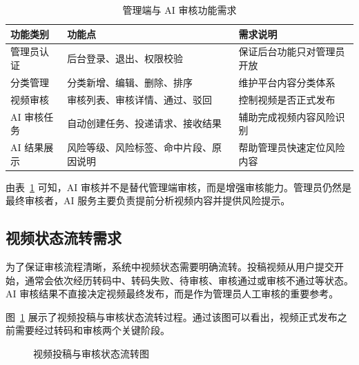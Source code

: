 \begin{table}[htbp]
  \centering
  \caption{管理端与 AI 审核功能需求}
  \label{tab:admin-ai-functions}
  \begin{tabular}{p{}p{}p{}}
    \hline
    \textbf{功能类别} & \textbf{功能点} & \textbf{需求说明} \\
    \hline
    管理员认证 & 后台登录、退出、权限校验 & 保证后台功能只对管理员开放 \\
    分类管理 & 分类新增、编辑、删除、排序 & 维护平台内容分类体系 \\
    视频审核 & 审核列表、审核详情、通过、驳回 & 控制视频是否正式发布 \\
    AI 审核任务 & 自动创建任务、投递请求、接收结果 & 辅助完成视频内容风险识别 \\
    AI 结果展示 & 风险等级、风险标签、命中片段、原因说明 & 帮助管理员快速定位风险内容 \\
    \hline
  \end{tabular}
\end{table}

由表~\ref{tab:admin-ai-functions} 可知，AI 审核并不是替代管理端审核，而是增强审核能力。管理员仍然是最终审核者，AI 服务主要负责提前分析视频内容并提供风险提示。

\subsection{视频状态流转需求}
\label{subsec:video-status-flow-requirements}

为了保证审核流程清晰，系统中视频状态需要明确流转。投稿视频从用户提交开始，通常会依次经历转码中、转码失败、待审核、审核通过或审核不通过等状态。AI 审核结果不直接决定视频最终发布，而是作为管理员人工审核的重要参考。

图~\ref{fig:video-status-flow} 展示了视频投稿与审核状态流转过程。通过该图可以看出，视频正式发布之前需要经过转码和审核两个关键阶段。

\begin{figure}[htbp]
  \centering
  \caption{视频投稿与审核状态流转图}
  \label{fig:video-status-flow}
\end{figure}

